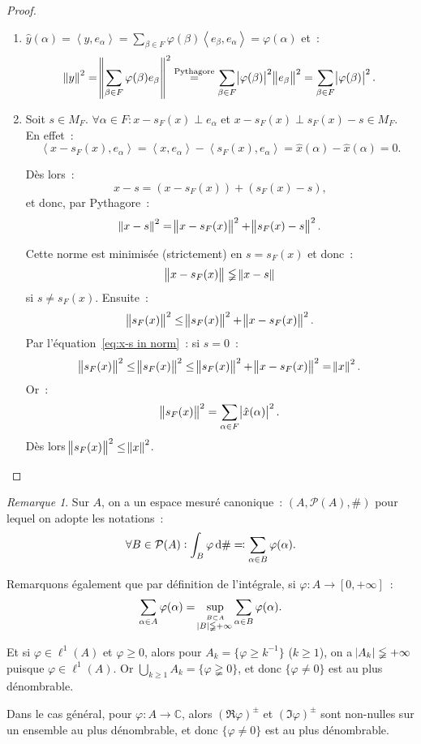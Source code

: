 \documentclass{report}
\newcommand{\C}{{\mathbb C}}
\newcommand{\scpr}[2]{\left\langle#1, #2\right\rangle}
\newcommand{\pinfty}{{+\infty}}
\theoremstyle{definition}
\theoremstyle{remark}
\newtheorem*{rmq}{Remarque}
\begin{document}
\begin{proof}~
\begin{enumerate}
	\item $\hat y(\alpha) = \scpr y{e_\alpha} = \sum_{\beta \in F}\varphi(\beta)\scpr {e_\beta}{e_\alpha} = \varphi(\alpha)$ et~:
	\[\norm y^2 = \norm {\sum_{\beta \in F}\varphi(\beta)e_\beta}^2 \stackrel {\text{Pythagore}}= \sum_{\beta \in F}\abs {\varphi(\beta)}^2\norm {e_\beta}^2 = \sum_{\beta \in F}\abs {\varphi(\beta)}^2.\]
	\item Soit $s \in M_F$. $\forall \alpha \in F : x-s_F(x) \perp e_\alpha$ et $x-s_F(x) \perp s_F(x)-s \in M_F$. En effet~:
	\[\scpr {x-s_F(x)}{e_\alpha} = \scpr x{e_\alpha} - \scpr {s_F(x)}{e_\alpha} = \hat x(\alpha) - \hat x(\alpha) = 0.\]

	Dès lors~:
	\[x-s = (x - s_F(x)) + (s_F(x) - s),\]
	et donc, par Pythagore~:
	\begin{align}\label{eq:x-s in norm}
		\norm {x-s}^2 = \norm {x-s_F(x)}^2 + \norm {s_F(x) - s}^2.
	\end{align}

	Cette norme est minimisée (strictement) en $s = s_F(x)$ et donc~:
	\[\norm {x-s_F(x)} \lneqq \norm {x-s}\]
	si $s \neq s_F(x)$. Ensuite~:
	\[\norm {s_F(x)}^2 \leq \norm {s_F(x)}^2 + \norm {x-s_F(x)}^2.\]
	Par l'équation~\ref{eq:x-s in norm}~: si $s = 0$~:
	\[\norm {s_F(x)}^2 \leq \norm {s_F(x)}^2 \leq \norm {s_F(x)}^2 + \norm {x-s_F(x)}^2 = \norm x^2.\]
	Or~:
	\[\norm {s_F(x)}^2 = \sum_{\alpha \in F}\abs {\hat x(\alpha)}^2.\]
	Dès lors $\norm {s_F(x)}^2 \leq \norm x^2$.
\end{enumerate}
\end{proof}

\begin{rmq} Sur $A$, on a un espace mesuré canonique~: $(A, \mathcal P(A), \#)$ pour lequel on adopte les notations~:
\[\forall B \in \mathcal P(A) : \int_B\varphi\dif\# \eqqcolon \sum_{\alpha \in B}\varphi(\alpha).\]

Remarquons également que par définition de l'intégrale, si $\varphi : A \to [0, \pinfty]$~:
\[\sum_{\alpha \in A}\varphi(\alpha) = \sup_{\stackrel {B \subset A}{\abs B \lneqq \pinfty}}\sum_{\alpha \in B}\varphi(\alpha).\]

Et si $\varphi \in \ell^1(A)$ et $\varphi \geq 0$, alors pour $A_k = \{\varphi \geq k^{-1}\}$ ($k \geq 1$), on a $\abs {A_k} \lneqq \pinfty$ puisque $\varphi \in \ell^1(A)$.
Or $\bigcup_{k \geq 1}A_k = \{\varphi \gneqq 0\}$, et donc $\{\varphi \neq 0\}$ est au plus dénombrable.

Dans le cas général, pour $\varphi : A \to \C$, alors $(\Re \varphi)^\pm$ et $(\Im \varphi)^\pm$ sont non-nulles sur un ensemble au plus dénombrable, et donc $\{\varphi \neq 0\}$
est au plus dénombrable.
\end{rmq}
\end{document}
